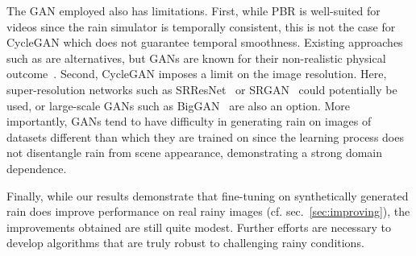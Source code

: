 The GAN employed also has limitations. First, while PBR is well-suited for videos since the rain simulator is temporally consistent, this is not the case for CycleGAN which does not guarantee temporal smoothness. Existing approaches such as \cite{bansal2018recycle} are alternatives, but GANs are known for their non-realistic physical outcome~\cite{xie2018tempogan}. Second, CycleGAN imposes a limit on the image resolution. Here, super-resolution networks such as SRResNet~\cite{dong2015image} or SRGAN~\cite{ledig2017photo} could potentially be used, or large-scale GANs such as BigGAN~\cite{brock2018large} are also an option. More importantly, GANs tend to have difficulty in generating rain on images of datasets different than which they are trained on since the learning process does not disentangle rain from scene appearance, demonstrating a strong domain dependence.

Finally, while our results demonstrate that fine-tuning on synthetically generated rain does improve performance on real rainy images (cf. sec.~\ref{sec:improving}), the improvements obtained are still quite modest. Further efforts are necessary to develop algorithms that are truly robust to challenging rainy conditions.

